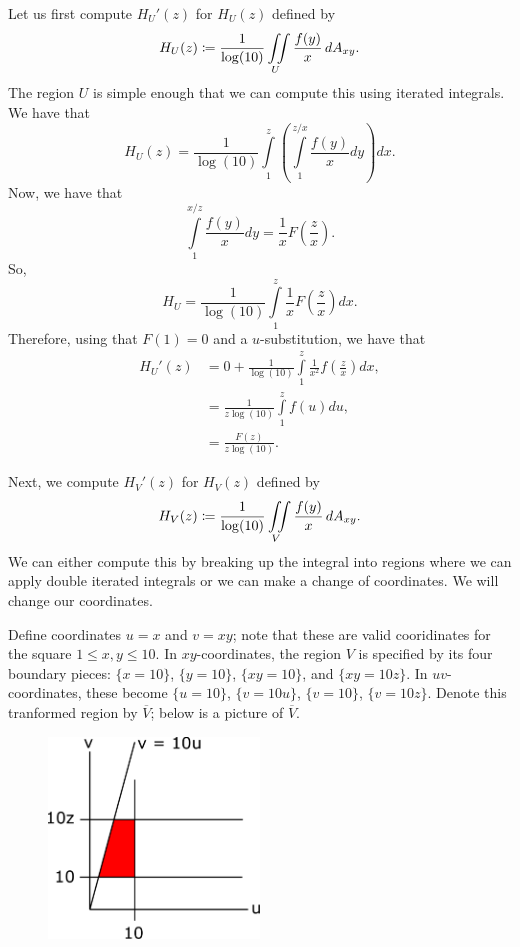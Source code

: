 Let us first compute \(H_U'(z)\) for \(H_U(z)\) defined by
\begin{equation}
H_U(z) \coloneqq \frac{1}{\log(10)} \iint\limits_U \frac{f(y)}{x}\, dA_{xy}. 
\end{equation}
The region \(U\) is simple enough that we can compute this using iterated integrals. We have that
\begin{equation}
H_U(z) = \frac{1}{\log(10)}\int\limits_{1}^{z} \left( \int\limits_{1}^{z/x} \frac{f(y)}{x} dy\right) dx. 
\end{equation}
Now, we have that
\begin{equation}
\int\limits_{1}^{x/z} \frac{f(y)}{x} dy = \frac{1}{x} F\left(\frac{z}{x}\right).
\end{equation}
So,
\begin{equation}
H_U = \frac{1}{\log(10)}\int\limits_1^z \frac{1}{x} F\left(\frac{z}{x}\right) dx. 
\end{equation}
Therefore, using that \(F(1) = 0\) and a \(u\)-substitution, we have that
\begin{align}
H_U'(z) & = 0 + \frac{1}{\log(10)} \int\limits_1^z \frac{1}{x^2} f\left(\frac{z}{x}\right) dx, \\ 
    & = \frac{1}{z\log(10)} \int\limits_1^{z} f(u) du, \\
& = \frac{F(z)}{z\log(10)}.
\end{align}

Next, we compute \(H_V'(z)\) for \(H_V(z)\) defined by
\begin{equation}
H_V(z) \coloneqq \frac{1}{\log(10)} \iint\limits_V \frac{f(y)}{x}\, dA_{xy}. 
\end{equation}
We can either compute this by breaking up the integral into regions where we can apply double iterated integrals or we can make a
change of coordinates. We will change our coordinates.

Define coordinates \(u = x\) and \(v = xy\); note that these are valid cooridinates for the square \(1 \leq x, y \leq 10\). In \(xy\)-coordinates,
the region \(V\) is specified by its four boundary pieces: \(\{x = 10\}\), \(\{y = 10\}\), \(\{xy = 10\}\), and \(\{xy = 10z\}\). In \(uv\)-coordinates,
these become \(\{u = 10\}\), \(\{v = 10u\}\), \(\{v = 10\}\), \(\{v = 10z\}\). Denote this tranformed region by \(\overline{V}\); below is a picture of \(\overline{V}\).

\begin{figure}[h]
\centering
\includegraphics[width = 0.5\textwidth]{multiVarIntCalc/uvRegion.pdf}
\end{figure} 

